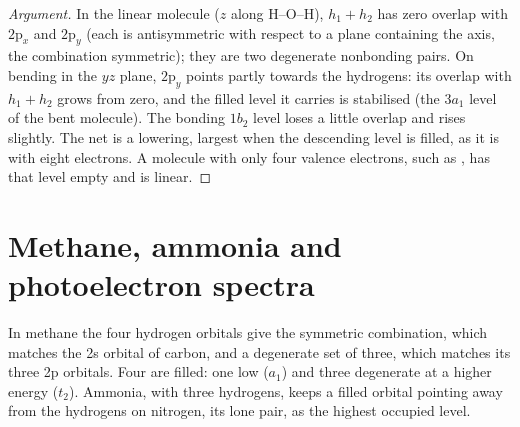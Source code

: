 \begin{proof}[Argument]
In the linear molecule ($z$ along H--O--H), $h_1 + h_2$ has zero overlap with
$2\mathrm p_x$ and $2\mathrm p_y$ (each is antisymmetric with respect to a plane
containing the axis, the combination symmetric); they are two degenerate
nonbonding pairs. On bending in the $yz$ plane, $2\mathrm p_y$ points partly towards
the hydrogens: its overlap with $h_1 + h_2$ grows from zero, and the filled level
it carries is stabilised (the $3a_1$ level of the bent molecule). The bonding
$1b_2$ level loses a little overlap and rises slightly. The net is a lowering,
largest when the descending level is filled, as it is with eight electrons. A
molecule with only four valence electrons, such as , has that level
empty and is linear.
\end{proof}

\section{Methane, ammonia and photoelectron spectra}

In methane the four hydrogen orbitals give the symmetric combination, which
matches the 2s orbital of carbon, and a degenerate set of three, which matches
its three 2p orbitals. Four  are filled: one low ($a_1$) and three
degenerate at a higher energy ($t_2$). Ammonia, with three hydrogens, keeps a
filled orbital pointing away from the hydrogens on nitrogen, its lone pair, as
the highest occupied level.


